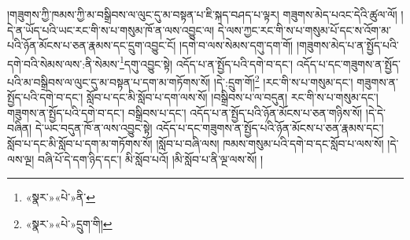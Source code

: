 །གཟུགས་ཀྱི་ཁམས་ཀྱི་མ་བསྒྲིབས་ལ་ལུང་དུ་མ་བསྟན་པ་ཇི་སྐད་བཤད་པ་ལྟར། གཟུགས་མེད་པའང་དེའི་ཚུལ་ལོ། །དེ་ན་ཡོད་པའི་ཡང་རང་གི་ས་པ་གསུམ་ཁོ་ན་ལས་འབྱུང་ལ། དེ་ལས་ཀྱང་རང་གི་ས་པ་གསུམ་པོ་དང་ས་འོག་མ་པའི་ཉོན་མོངས་པ་ཅན་རྣམས་དང་དྲུག་འབྱུང་ངོ། །དགེ་བ་ལས་སེམས་དགུ་དག་གོ། །གཟུགས་མེད་པ་ན་སྤྱོད་པའི་དགེ་བའི་སེམས་ལས་:ནི་སེམས་\footnote{«སྣར་»«པེ་»ནི་}དགུ་འབྱུང་སྟེ། འདོད་པ་ན་སྤྱོད་པའི་དགེ་བ་དང་། འདོད་པ་དང་གཟུགས་ན་སྤྱོད་པའི་མ་བསྒྲིབས་ལ་ལུང་དུ་མ་བསྟན་པ་དག་མ་གཏོགས་སོ། །དེ་:དྲུག་གོ།\footnote{«སྣར་»«པེ་»དྲུག་གི།} །རང་གི་ས་པ་གསུམ་དང་། གཟུགས་ན་སྤྱོད་པའི་དགེ་བ་དང་། སློབ་པ་དང་མི་སློབ་པ་དག་ལས་སོ། །བསྒྲིབས་པ་ལ་བདུན། རང་གི་ས་པ་གསུམ་དང་། གཟུགས་ན་སྤྱོད་པའི་དགེ་བ་དང་། བསྒྲིབས་པ་དང་། འདོད་པ་ན་སྤྱོད་པའི་ཉོན་མོངས་པ་ཅན་གཉིས་སོ། །དེ་དེ་བཞིན། དེ་ཡང་བདུན་ཁོ་ན་ལས་འབྱུང་སྟེ། འདོད་པ་དང་གཟུགས་ན་སྤྱོད་པའི་ཉོན་མོངས་པ་ཅན་རྣམས་དང་། སློབ་པ་དང་མི་སློབ་པ་དག་མ་གཏོགས་སོ། །སློབ་པ་བཞི་ལས། ཁམས་གསུམ་པའི་དགེ་བ་དང་སློབ་པ་ལས་སོ། །དེ་ལས་ལྔ། བཞི་པོ་དེ་དག་ཉིད་དང་། མི་སློབ་པའོ། །མི་སློབ་པ་ནི་ལྔ་ལས་སོ། །
